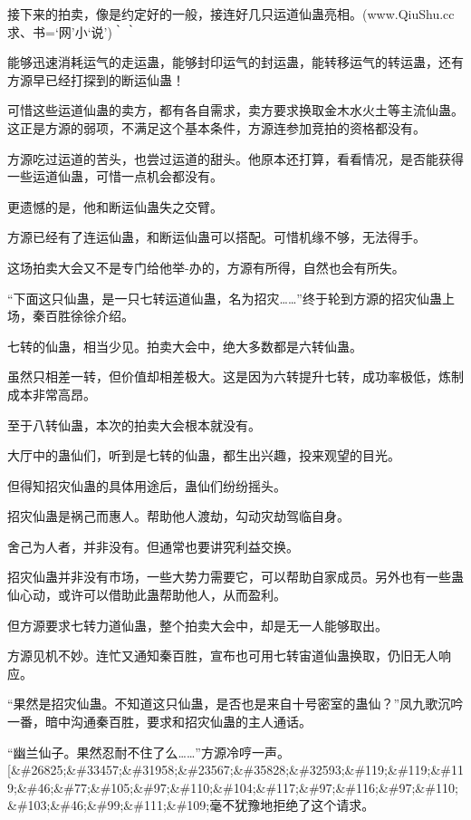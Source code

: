 
\begin{this_body}

接下来的拍卖，像是约定好的一般，接连好几只运道仙蛊亮相。(www.QiuShu.cc 求、书=‘网’小‘说’)｀｀

能够迅速消耗运气的走运蛊，能够封印运气的封运蛊，能转移运气的转运蛊，还有方源早已经打探到的断运仙蛊！

可惜这些运道仙蛊的卖方，都有各自需求，卖方要求换取金木水火土等主流仙蛊。这正是方源的弱项，不满足这个基本条件，方源连参加竞拍的资格都没有。

方源吃过运道的苦头，也尝过运道的甜头。他原本还打算，看看情况，是否能获得一些运道仙蛊，可惜一点机会都没有。

更遗憾的是，他和断运仙蛊失之交臂。

方源已经有了连运仙蛊，和断运仙蛊可以搭配。可惜机缘不够，无法得手。

这场拍卖大会又不是专门给他举-办的，方源有所得，自然也会有所失。

“下面这只仙蛊，是一只七转运道仙蛊，名为招灾……”终于轮到方源的招灾仙蛊上场，秦百胜徐徐介绍。

七转的仙蛊，相当少见。拍卖大会中，绝大多数都是六转仙蛊。

虽然只相差一转，但价值却相差极大。这是因为六转提升七转，成功率极低，炼制成本非常高昂。

至于八转仙蛊，本次的拍卖大会根本就没有。

大厅中的蛊仙们，听到是七转的仙蛊，都生出兴趣，投来观望的目光。

但得知招灾仙蛊的具体用途后，蛊仙们纷纷摇头。

招灾仙蛊是祸己而惠人。帮助他人渡劫，勾动灾劫驾临自身。

舍己为人者，并非没有。但通常也要讲究利益交换。

招灾仙蛊并非没有市场，一些大势力需要它，可以帮助自家成员。另外也有一些蛊仙心动，或许可以借助此蛊帮助他人，从而盈利。

但方源要求七转力道仙蛊，整个拍卖大会中，却是无一人能够取出。

方源见机不妙。连忙又通知秦百胜，宣布也可用七转宙道仙蛊换取，仍旧无人响应。

“果然是招灾仙蛊。不知道这只仙蛊，是否也是来自十号密室的蛊仙？”凤九歌沉吟一番，暗中沟通秦百胜，要求和招灾仙蛊的主人通话。

“幽兰仙子。果然忍耐不住了么……”方源冷哼一声。[\&\#26825;\&\#33457;\&\#31958;\&\#23567;\&\#35828;\&\#32593;\&\#119;\&\#119;\&\#119;\&\#46;\&\#77;\&\#105;\&\#97;\&\#110;\&\#104;\&\#117;\&\#97;\&\#116;\&\#97;\&\#110;\&\#103;\&\#46;\&\#99;\&\#111;\&\#109;毫不犹豫地拒绝了这个请求。


\end{this_body}
